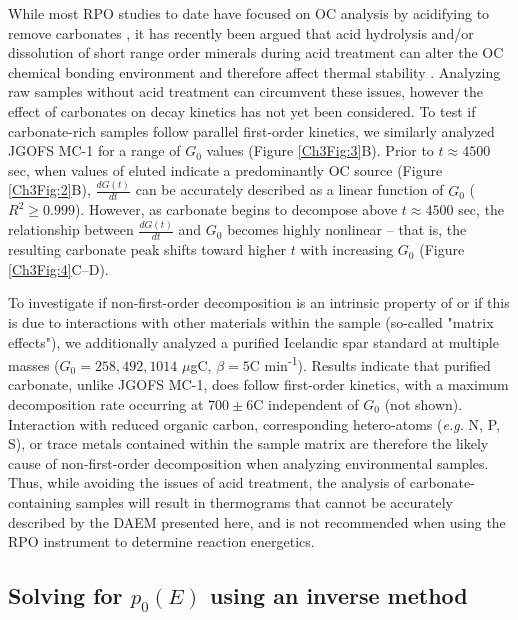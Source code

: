 While most RPO studies to date have focused on OC analysis by acidifying to remove carbonates \citep[\textit{e.g.}][]{Rosenheim:2008ed,Rosenheim:2012kh,Rosenheim:2013dka,Schreiner:2014jr,Bianchi:2015jr}, it has recently been argued that acid hydrolysis and/or dissolution of short range order minerals during acid treatment can alter the OC chemical bonding environment and therefore affect thermal stability \citep{Plante:2013tu}. Analyzing raw samples without acid treatment can circumvent these issues, however the effect of carbonates on decay kinetics has not yet been considered. To test if carbonate-rich samples follow parallel first-order kinetics, we similarly analyzed JGOFS MC-1 for a range of $G_{0}$ values (Figure \ref{Ch3Fig:3}B). Prior to $t \approx 4500$ sec, when  values of eluted  indicate a predominantly OC source (Figure \ref{Ch3Fig:2}B), $\frac{dG(t)}{dt}$ can be accurately described as a linear function of $G_{0}$ ($R^{2} \geq 0.999$). However, as carbonate begins to decompose above $t \approx 4500$ sec, the relationship between $\frac{dG(t)}{dt}$ and $G_{0}$ becomes highly nonlinear -- that is, the resulting carbonate peak shifts toward higher $t$ with increasing $G_{0}$ (Figure \ref{Ch3Fig:4}C--D). 

To investigate if non-first-order decomposition is an intrinsic property of  or if this is due to interactions with other materials within the sample (so-called "matrix effects"), we additionally analyzed a purified Icelandic spar  standard at multiple masses ($G_{0} = 258, 492, 1014$ $\mu$gC, $\beta = 5$\textdegree C min\textsuperscript{-1}). Results indicate that purified carbonate, unlike JGOFS MC-1, does follow first-order kinetics, with a maximum decomposition rate occurring at $700 \pm 6$\textdegree C independent of $G_{0}$ (not shown). Interaction with reduced organic carbon, corresponding hetero-atoms (\textit{e.g.} N, P, S), or trace metals contained within the sample matrix are therefore the likely cause of non-first-order  decomposition when analyzing environmental samples. Thus, while avoiding the issues of acid treatment, the analysis of carbonate-containing samples will result in thermograms that cannot be accurately described by the DAEM presented here, and is not recommended when using the RPO instrument to determine reaction energetics.


\subsection{Solving for $p_{0}(E)$ using an inverse method}

